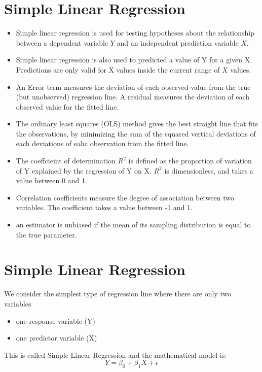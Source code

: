 \documentclass[]{report}
\begin{document}
	\section{Simple Linear Regression }
	\begin{itemize}
		\item 
		Simple linear regression is used for testing hypotheses about the relationship between a dependent variable $Y$ and an independent prediction variable $X$.
		
		\item 	Simple linear regression is also used to predicted a value of Y for a given X. Predictions are only valid for X values inside 
		the current range of $X$ values. 
		
		\item 	An Error term measures the deviation of each observed value from the true (but unobserved) regression line.
		A residual measures the deviation of each observed value for the fitted line.
		
		\item 	The ordinary least squares (OLS) method gives the best straight line that fits the observations, by minimizing the sum of the
		squared vertical deviations of each deviations of eahc observation from the fitted line.
		\item The coeffcieint of determination $R^2$ is defined as the proportion of variation of Y explained by the regression of Y on X. $R^2$ is dimensionless, and takes a value between 0 and 1.
		
		\item 	Correlation coefficients measure the degree of association between two variables. The coefficient takes a value between -1 and 1.
		
		\item 	an estimator is unbiased if the mean of its sampling distribution is equal to the true parameter.
	\end{itemize}
	

\section{Simple Linear Regression}
We consider the simplest type of regression line where there are only two
variables
\begin{itemize}
	\item  one response variable (Y)
	\item one predictor variable (X)
\end{itemize}
This is called Simple Linear Regression and the mathematical model is:
\[ Y = \beta_0 + \beta_1X + \epsilon \]
\end{document}
